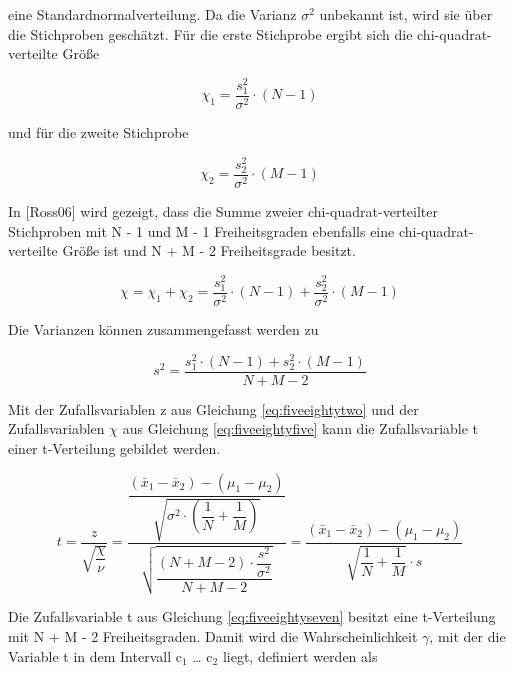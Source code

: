 \noindent eine Standardnormalverteilung. Da die Varianz $\sigma^{2}$ unbekannt ist, wird sie \"{u}ber die Stichproben gesch\"{a}tzt. F\"{u}r die erste Stichprobe ergibt sich die chi-quadrat-verteilte Gr\"{o}{\ss}e

\begin{equation}\label{eq:fiveeightythree}
\chi _{1} =\dfrac{s_{1}^{2} }{\sigma ^{2}} \cdot (N-1)
\end{equation}

\noindent und f\"{u}r die zweite Stichprobe

\begin{equation}\label{eq:fiveeightyfour}
\chi _{2} =\dfrac{s_{2}^{2} }{\sigma ^{2}} \cdot (M-1)
\end{equation}

\noindent In [Ross06] wird gezeigt, dass die Summe zweier chi-quadrat-verteilter Stichproben mit N - 1 und M - 1 Freiheitsgraden ebenfalls eine chi-quadrat-verteilte Gr\"{o}{\ss}e ist und N + M - 2 Freiheitsgrade besitzt.

\begin{equation}\label{eq:fiveeightyfive}
\chi =\chi _{1} +\chi _{2} =\dfrac{s_{1}^{2} }{\sigma ^{2} } \cdot (N-1)+\dfrac{s_{2}^{2}}{\sigma ^{2}} \cdot (M-1)
\end{equation}

\noindent Die Varianzen k\"{o}nnen zusammengefasst werden zu

\begin{equation}\label{eq:fiveeightysix}
s^{2} =\dfrac{s_{1}^{2} \cdot (N-1)+s_{2}^{2} \cdot (M-1)}{N+M-2}
\end{equation}

\noindent Mit der Zufallsvariablen z aus Gleichung \eqref{eq:fiveeightytwo} und der Zufallsvariablen $\chi$ aus Gleichung \eqref{eq:fiveeightyfive} kann die Zufallsvariable t einer t-Verteilung gebildet werden.

\begin{equation}\label{eq:fiveeightyseven}
t=\dfrac{z}{\sqrt{\dfrac{\chi}{\nu}}} =\dfrac{\dfrac{\left(\bar{x}_{1} -\bar{x}_{2} \right)-\left(\mu _{1} -\mu _{2} \right)}{\sqrt{\sigma ^{2} \cdot \left(\dfrac{1}{N} +\dfrac{1}{M} \right)}}}{\sqrt{\dfrac{\left(N+M-2\right)\cdot \dfrac{s^{2} }{\sigma ^{2}}}{N+M-2}}} =\dfrac{\left(\bar{x}_{1} -\bar{x}_{2} \right)-\left(\mu _{1} -\mu _{2} \right)}{\sqrt{\dfrac{1}{N} +\dfrac{1}{M}} \cdot s}
\end{equation}

\noindent Die Zufallsvariable t aus Gleichung \eqref{eq:fiveeightyseven} besitzt eine t-Verteilung mit N + M - 2 Freiheitsgraden. Damit wird die Wahrscheinlichkeit $\gamma$, mit der die Variable t in dem Intervall c$_{1}$ {\dots} c$_{2}$ liegt, definiert werden als

